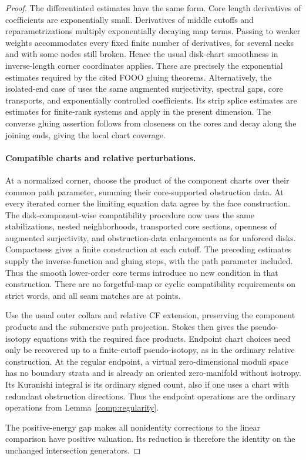 \begin{proof}
The differentiated estimates have the same form.  Core length
derivatives of coefficients are exponentially small.  Derivatives
of middle cutoffs and reparametrizations multiply exponentially
decaying map terms.  Passing to weaker weights accommodates every
fixed finite number of derivatives, for several necks and with
some nodes still broken.  Hence the usual disk-chart smoothness in
inverse-length corner coordinates applies.  These are precisely
the exponential estimates required by the cited FOOO gluing
theorems.  Alternatively, the isolated-end case of
\cite[Lemma~4.11 and Proposition~4.12]{A8} uses the same augmented
surjectivity, spectral gaps, core transports, and exponentially
controlled coefficients.  Its strip splice estimates are estimates
for finite-rank systems and apply in the present dimension.  The
converse gluing assertion follows from closeness on the cores and
decay along the joining ends, giving the local chart coverage.

\paragraph{Compatible charts and relative perturbations.}
At a normalized corner, choose the product of the component
charts over their common path parameter, summing their
core-supported obstruction data.  At every iterated corner the
limiting equation data agree by the face construction.  The
disk-component-wise compatibility procedure now uses the same
stabilizations, nested neighborhoods, transported core sections,
openness of augmented surjectivity, and obstruction-data
enlargements as for unforced disks.  Compactness gives a finite
construction at each cutoff.  The preceding estimates supply the
inverse-function and gluing steps, with the path parameter included.
Thus the smooth lower-order core terms introduce no new condition
in that construction.  There are no forgetful-map or cyclic
compatibility requirements on strict words, and all seam matches
are at points.

Use the usual outer collars and relative CF extension, preserving
the component products and the submersive path projection.  Stokes
then gives the pseudo-isotopy equations with the required face
products.  Endpoint chart choices need only be recovered up to a
finite-cutoff pseudo-isotopy, as in the ordinary relative
construction.  At the regular endpoint, a virtual zero-dimensional
moduli space has no boundary strata and is already an oriented
zero-manifold without isotropy.  Its Kuranishi integral is its
ordinary signed count, also if one uses a chart with redundant
obstruction directions.  Thus the endpoint operations are the
ordinary operations from Lemma~\ref{comp:regularity}.

The positive-energy gap makes all nonidentity corrections to the
linear comparison have positive valuation.  Its reduction is
therefore the identity on the unchanged intersection generators.
\end{proof}

